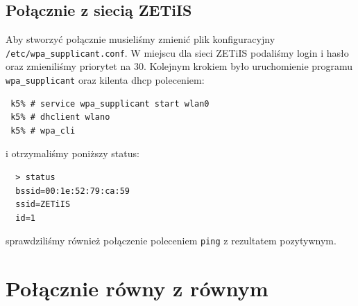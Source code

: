 \documentclass[a4paper,11pt,notitlepage]{article}
\begin{document}
\subsection{Połącznie z siecią ZETiIS}

Aby stworzyć połącznie musieliśmy zmienić plik konfiguracyjny \verb+/etc/wpa_supplicant.conf+. W miejscu dla sieci ZETiIS podaliśmy login i hasło oraz zmieniliśmy priorytet 
na 30. Kolejnym krokiem było uruchomienie programu \verb+wpa_supplicant+ oraz kilenta dhcp poleceniem:
\begin{verbatim}
 k5% # service wpa_supplicant start wlan0
 k5% # dhclient wlano
 k5% # wpa_cli 
\end{verbatim}
 i otrzymaliśmy poniższy status:
 \begin{verbatim}
  > status
  bssid=00:1e:52:79:ca:59
  ssid=ZETiIS
  id=1
 \end{verbatim}
sprawdziliśmy również połączenie poleceniem \verb+ping+ z rezultatem pozytywnym.

\section{Połącznie równy z równym}
\end{document}
